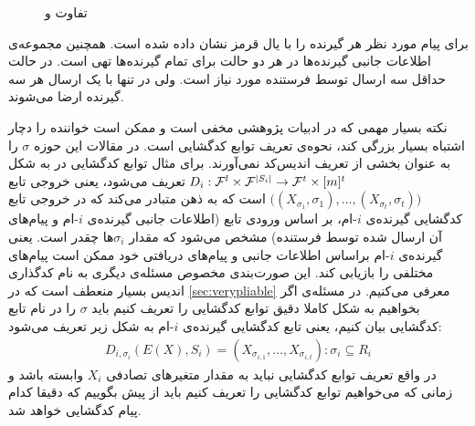 \begin{remark}
\begin{figure}
\begin{subfigure}[b]{0.45\textwidth}
    		\caption{\icod}
    	\end{subfigure}
    	\caption[تفاوت
    	\icod
    	و
    	\picod
    	]{
    		تفاوت
    		\icod
    		و
    		\picod
    	}
    	\label{fig:pliablefragouli1}
    \end{figure}
    برای
    \icod
    پیام مورد نظر هر گیرنده را با یال قرمز نشان داده شده است. همچنین مجموعه‌ی اطلاعات جانبی گیرنده‌ها در هر دو حالت برای تمام گیرنده‌ها تهی است. در حالت
    \icod
    حداقل سه ارسال توسط فرستنده مورد نیاز است. ولی در
    \picod
    تنها با یک ارسال هر سه گیرنده ارضا می‌شوند.
\end{remark}
\begin{remark}
    \label{remark:pliablevsvery}
    نکته بسیار مهمی که در ادبیات پژوهشی
    \picod
    مخفی است و ممکن است خواننده را دچار اشتباه بسیار بزرگی کند، نحوه‌ی تعریف توابع کدگشایی است. در مقالات این حوزه
    $\sigma$
    را به عنوان بخشی از تعریف اندیس‌کد نمی‌آورند. برای مثال توابع کدگشایی در
    \cite{song2017polynomialtime}
    به شکل
    $D_i: \mathcal{F}^l \times \mathcal{F}^{\left|{S_i}\right|} \rightarrow \mathcal{F}^t \times [m]^t$
    تعریف می‌شود، یعنی خروجی تابع
    $\big((X_{\sigma_1}, \sigma_1), \ldots, (X_{\sigma_t}, \sigma_t) \big)$
    است که به ذهن متبادر می‌کند که در خروجی تابع کدگشایی گیرنده‌ی
    $i$-ام، بر اساس ورودی تابع (اطلاعات جانبی گیرنده‌ی
    $i$-ام و پیام‌های آن ارسال شده توسط فرستنده) مشخص می‌شود که مقدار
    $\sigma_i$ها چقدر است. یعنی گیرنده‌ی
    $i$-ام براساس اطلاعات جانبی و پیام‌های دریافتی خود ممکن است پیام‌های مختلفی را بازیابی کند. این صورت‌بندی مخصوص مسئله‌ی دیگری به نام کدگذاری اندیس بسیار منعطف است که در
    \autoref{sec:verypliable}
    معرفی می‌کنیم. در مسئله‌ی
    \picod
    اگر بخواهیم به شکل کاملا دقیق توابع کدگشایی را تعریف کنیم باید
    $\sigma$
    را در نام تابع کدگشایی بیان کنیم، یعنی تابع کدگشایی گیرنده‌ی
    $i$-ام به شکل زیر تعریف می‌شود:
    \begin{align}
        D_{i, \sigma_i}(E(X), S_i) = (X_{\sigma_{i,1}}, \ldots, X_{\sigma_{i,t}}): \sigma_i \subseteq R_i
    \end{align}
    در واقع تعریف توابع کدگشایی نباید به مقدار متغیرهای تصادفی
    $X_i$
    وابسته باشد و زمانی که می‌خواهیم توابع کدگشایی را تعریف کنیم باید از پیش بگوییم که دقیقا کدام پیام کدگشایی خواهد شد.
\end{remark}

